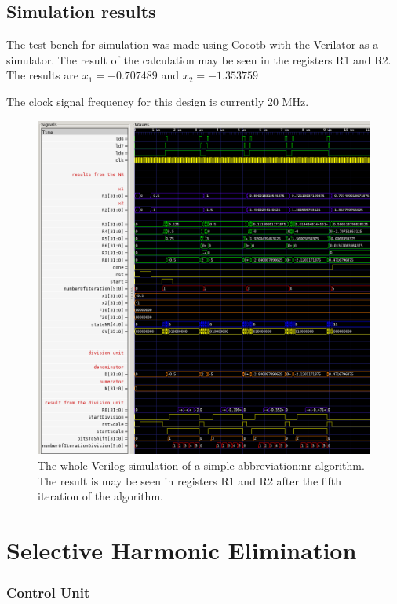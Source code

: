 \documentclass[a4paper, twoside, 11pt]{article}
\begin{document}
    \subsection{Simulation results}
        The test bench for simulation was made using Cocotb \cite{cocotb} with the Verilator \cite{verilator} as a simulator. The result of the calculation may be seen in the registers R1 and R2. The results are $x_1 = - 0.707489$ and $x_2 = - 1.353759$\par
        The clock signal frequency for this design is currently 20 MHz.
            \begin{figure}[htbp!]
                \centering
                \includegraphics[width=1\textwidth]{src/png/simple-nr-sim.png}
                \caption{The whole Verilog simulation of a simple \gls{abbreviation:nr} algorithm. The result is may be seen in registers R1 and R2 after the fifth iteration of the algorithm.}
                \label{fig:simple-nr-sim}
            \end{figure}



\section{Selective Harmonic Elimination}
    
        \subsubsection{Control Unit}\label{subsubsec:selective-harmonic-elimination-control-unit}
\end{document}
